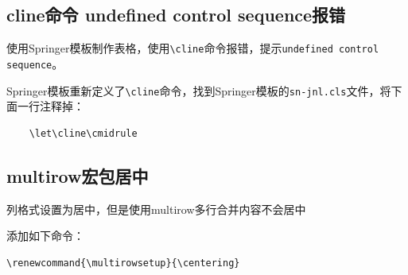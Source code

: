 \subsection{cline命令 undefined control sequence报错}\label{subsec:cline-undefined-control-sequence-error}
使用Springer模板制作表格，使用\lstinline{\cline}命令报错，提示\lstinline{undefined control sequence}。

Springer模板重新定义了\lstinline{\cline}命令，找到Springer模板的\lstinline{sn-jnl.cls}文件，将下面一行注释掉：
\begin{lstlisting}
    \let\cline\cmidrule
\end{lstlisting}

\subsection{multirow宏包居中}\label{subsec:multirow-center}

列格式设置为居中，但是使用multirow多行合并内容不会居中

添加如下命令：
\begin{lstlisting}
\renewcommand{\multirowsetup}{\centering}
\end{lstlisting}
